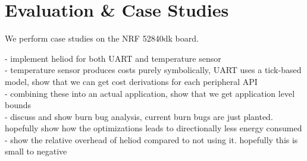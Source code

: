 \section{Evaluation \& Case Studies}

We perform case studies on the NRF 52840dk board. 

- implement heliod for both UART and temperature sensor \\
- temperature sensor produces costs purely symbolically, UART uses a tick-based model, show that we can get cost derivations for each peripheral API \\
- combining these into an actual application, show that we get application level bounds \\
- discuss and show burn bug analysis, current burn bugs are just planted. hopefully show how the optimizations leads to directionally less energy consumed \\
- show the relative overhead of heliod compared to not using it. hopefully this is small to negative